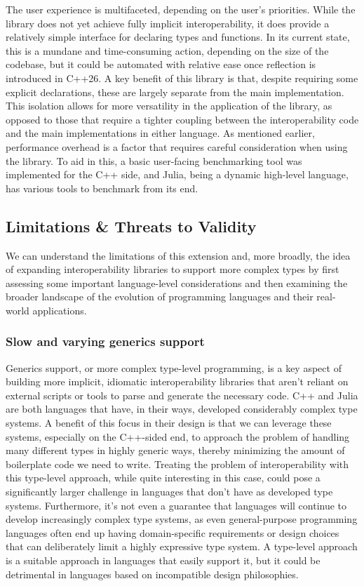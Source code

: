 The user experience is multifaceted, depending on the user's priorities. While the library does not yet achieve fully implicit interoperability, it does provide a relatively simple interface for declaring types and functions. In its current state, this is a mundane and time-consuming action, depending on the size of the codebase, but it could be automated with relative ease once reflection is introduced in C++26. A key benefit of this library is that, despite requiring some explicit declarations, these are largely separate from the main implementation. This isolation allows for more versatility in the application of the library, as opposed to those that require a tighter coupling between the interoperability code and the main implementations in either language. As mentioned earlier, performance overhead is a factor that requires careful consideration when using the library. To aid in this, a basic user-facing benchmarking tool was implemented for the C++ side, and Julia, being a dynamic high-level language, has various tools to benchmark from its end.

\subsection{Limitations \& Threats to Validity}

We can understand the limitations of this extension and, more broadly, the idea of expanding interoperability libraries to support more complex types by first assessing some important language-level considerations and then examining the broader landscape of the evolution of programming languages and their real-world applications.

\subsubsection{Slow and varying generics support}

Generics support, or more complex type-level programming, is a key aspect of building more implicit, idiomatic interoperability libraries that aren't reliant on external scripts or tools to parse and generate the necessary code. C++ and Julia are both languages that have, in their ways, developed considerably complex type systems. A benefit of this focus in their design is that we can leverage these systems, especially on the C++-sided end, to approach the problem of handling many different types in highly generic ways, thereby minimizing the amount of boilerplate code we need to write. Treating the problem of interoperability with this type-level approach, while quite interesting in this case, could pose a significantly larger challenge in languages that don't have as developed type systems. Furthermore, it's not even a guarantee that languages will continue to develop increasingly complex type systems, as even general-purpose programming languages often end up having domain-specific requirements or design choices that can deliberately limit a highly expressive type system. A type-level approach is a suitable approach in languages that easily support it, but it could be detrimental in languages based on incompatible design philosophies.

